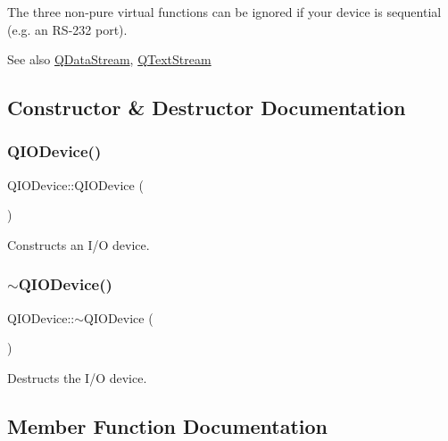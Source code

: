 The three non-\/pure virtual functions can be ignored if your device is sequential (e.\+g. an R\+S-\/232 port).

\begin{DoxySeeAlso}{See also}
\mbox{\hyperlink{class_q_data_stream}{Q\+Data\+Stream}}, \mbox{\hyperlink{class_q_text_stream}{Q\+Text\+Stream}} 
\end{DoxySeeAlso}


\subsection{Constructor \& Destructor Documentation}
\mbox{\label{class_q_i_o_device_a6ccc9ce76acdca224d0c3ded7d303f02}} 
\subsubsection{\texorpdfstring{QIODevice()}{QIODevice()}}
{\footnotesize\ttfamily Q\+I\+O\+Device\+::\+Q\+I\+O\+Device (\begin{DoxyParamCaption}{ }\end{DoxyParamCaption})}

Constructs an I/O device. \mbox{\label{class_q_i_o_device_a2510afba0e06ba9edc0d518fa2a8d1fa}} 
\subsubsection{\texorpdfstring{$\sim$QIODevice()}{~QIODevice()}}
{\footnotesize\ttfamily Q\+I\+O\+Device\+::$\sim$\+Q\+I\+O\+Device (\begin{DoxyParamCaption}{ }\end{DoxyParamCaption})\hspace{0.3cm}{\ttfamily [virtual]}}

Destructs the I/O device. 

\subsection{Member Function Documentation}
\mbox{\label{class_q_i_o_device_a0dee1db4a9e506924ccac6982ffdf3df}} 
